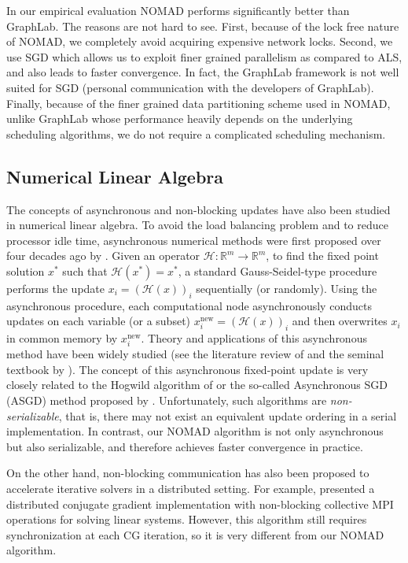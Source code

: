 \documentclass{vldb}
\begin{document}
In our empirical evaluation NOMAD performs significantly better than
GraphLab. The reasons are not hard to see. First, because of the lock
free nature of NOMAD, we completely avoid acquiring expensive network
locks. Second, we use SGD which allows us to exploit finer grained
parallelism as compared to ALS, and also leads to faster convergence. In
fact, the GraphLab framework is not well suited for SGD (personal
communication with the developers of GraphLab). Finally, because of the
finer grained data partitioning scheme used in NOMAD, unlike GraphLab
whose performance heavily depends on the underlying scheduling
algorithms, we do not require a complicated scheduling mechanism.

\subsection{Numerical Linear Algebra}
\label{sec:NumerLineAlgebra}

The concepts of asynchronous and non-blocking updates have also been
studied in numerical linear algebra. To avoid the load balancing problem
and to reduce processor idle time, asynchronous numerical methods were
first proposed over four decades ago by \citet{ChaMir69}.  Given an
operator $\mathcal{H}: {\mathbb{R}}^m \rightarrow {\mathbb{R}}^m$, to
find the fixed point solution $x^*$ such that $\mathcal{H}(x^*)=x^*$, a
standard Gauss-Seidel-type procedure performs the update
$x_i=\left(\mathcal{H}(x)\right)_i$ sequentially (or randomly).  Using
the asynchronous procedure, each computational node asynchronously
conducts updates on each variable (or a subset) $x_i^{\text{new}} =
\left(\mathcal{H}(x)\right)_i$ and then overwrites $x_i$ in common
memory by $x_i^{\text{new}}$.  Theory and applications of this
asynchronous method have been widely studied (see the literature review
of \citet{FroSzy00} and the seminal textbook by \citet{BerTsi97a}).  The
concept of this asynchronous fixed-point update is very closely related
to the Hogwild algorithm of \citet{RecReWriNiu11} or the so-called
Asynchronous SGD (ASGD) method proposed by
\citet{TefMakGem12}. Unfortunately, such algorithms are
\emph{non-serializable}, that is, there may not exist an equivalent
update ordering in a serial implementation.  In contrast, our NOMAD
algorithm is not only asynchronous but also serializable, and therefore
achieves faster convergence in practice.

On the other hand, non-blocking communication has also been proposed to
accelerate iterative solvers in a distributed setting.  For example,
\citet{HoeGotRehLum06} presented a distributed conjugate gradient
implementation with non-blocking collective MPI operations for solving
linear systems. However, this algorithm still requires synchronization
at each CG iteration, so it is very different from our NOMAD algorithm.
\end{document}
